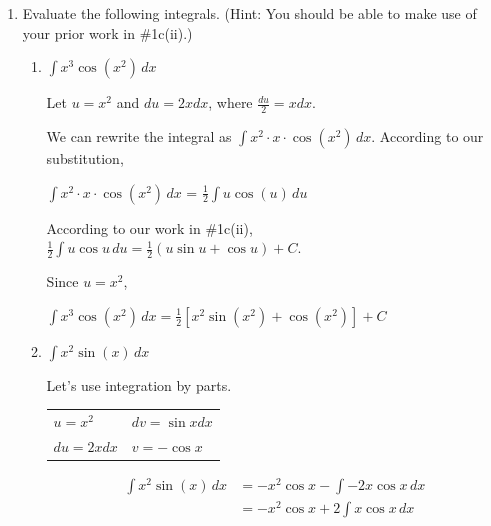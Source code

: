 \documentclass{article}
\begin{document}
\begin{enumerate}
\begin{enumerate}
\begin{enumerate}
        \end{enumerate}
        \end{enumerate}

    \pspace{\vfill}
    
    \item Evaluate the following integrals. (Hint: You should be able to make use of your prior work in \#1c(ii).)
    \begin{enumerate}
    \item $\displaystyle \int x^3\cos (x^2)\, dx$ 
    
    \begin{solution}
        Let $u=x^2$ and $du=2xdx$, where $\frac{du}{2}=xdx$.
        
        We can rewrite the integral as $\displaystyle \int x^2\cdot x\cdot\cos (x^2)\, dx$. According to our substitution, 
        \begin{center}
        $\displaystyle \int x^2\cdot x\cdot\cos (x^2)\, dx$ = $\displaystyle \frac{1}{2}\int u \cos (u)\, du$
        \end{center}

        According to our work in \#1c(ii), $\displaystyle \frac{1}{2} \int u\cos u\,du = \frac{1}{2}(u\sin u + \cos u) +C$. 
        
        Since $u=x^2$,
        \begin{center}
            $\displaystyle \int x^3\cos (x^2)\, dx = \frac{1}{2}[x^2\sin (x^2) + \cos (x^2)]+C$
        \end{center}
        \end{solution}
        \pspace{\vfill}
  
    \item $\displaystyle \int x^2\sin (x)\, dx$ 
   
   
        \begin{solution}
        Let's use integration by parts. 

                  
\begin{tabular}{ l l }
  $u=x^2$ &  $dv = \sin xdx$  \\
  $du=2xdx$ &  $v=-\cos x$  \\
\end{tabular}
\begin{align*}
\displaystyle \int x^2\sin(x)\,dx&=-x^2\cos x-\displaystyle \int -2x\cos x\,dx\\
&=-x^2\cos x +\displaystyle 2 \int x\cos x\,dx\\
\end{align*}


\end{solution}
\end{enumerate}
\end{enumerate}
\end{document}
